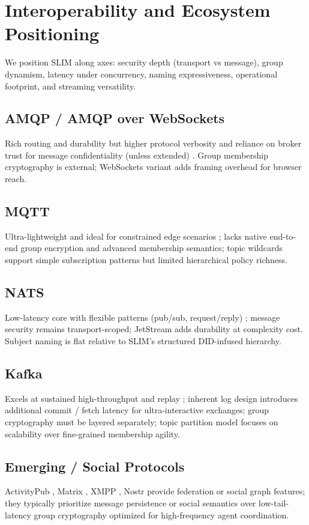 \documentclass{article}
\theoremstyle{definition}
\theoremstyle{remark}
\begin{document}
\section{Interoperability and Ecosystem Positioning}\label{sec:comparison}
We position SLIM along axes: security depth (transport vs message), group
dynamism, latency under concurrency, naming expressiveness, operational
footprint, and streaming versatility.
\subsection{AMQP / AMQP over WebSockets}
Rich routing and durability but higher protocol verbosity and reliance on
broker trust for message confidentiality (unless extended) \citep{amqp10}.
Group membership cryptography is external; WebSockets variant adds framing
overhead for browser reach.
\subsection{MQTT}
Ultra-lightweight and ideal for constrained edge scenarios \citep{mqtt311};
lacks native end-to-end group encryption and advanced membership semantics;
topic wildcards support simple subscription patterns but limited hierarchical
policy richness.
\subsection{NATS}
Low-latency core with flexible patterns (pub/sub, request/reply)
\citep{nats}; message security remains transport-scoped; JetStream adds
durability at complexity cost. Subject naming is flat relative to SLIM's
structured DID-infused hierarchy.
\subsection{Kafka}
Excels at sustained high-throughput and replay \citep{kafka}; inherent log
design introduces additional commit / fetch latency for ultra-interactive
exchanges; group cryptography must be layered separately; topic partition
model focuses on scalability over fine-grained membership agility.
\subsection{Emerging / Social Protocols}
ActivityPub \citep{activitypub}, Matrix \citep{matrixspec}, XMPP
\citep{xmpp-core}, Nostr \citep{nostr} provide federation or social graph
features; they typically prioritize message persistence or social semantics
over low-tail-latency group cryptography optimized for high-frequency agent
coordination.
\end{document}
